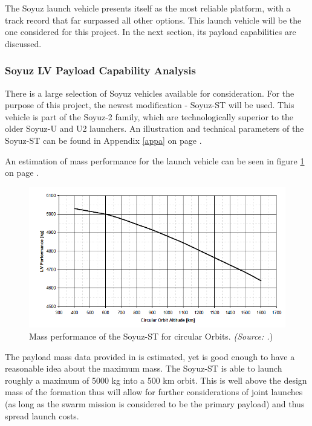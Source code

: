 The Soyuz launch vehicle presents itself as the most reliable platform, with a track record that far surpassed all other options. This launch vehicle will be the one considered for this project. In the next section, its payload capabilities are discussed.

\subsubsection{Soyuz LV Payload Capability Analysis}
\label{frLVPCA}

There is a large selection of Soyuz vehicles available for consideration. For the purpose of this project, the newest modification - Soyuz-ST will be used. This vehicle is part of the Soyuz-2 family, which are technologically superior to the older Soyuz-U and U2 launchers. An illustration and technical parameters of the Soyuz-ST can be found in Appendix \ref{appa} on page \pageref{appa} \cite{soyuzman}.

An estimation of mass performance for the launch vehicle can be seen in figure \ref{fig:massperformance} on page \pageref{fig:massperformance}.

\begin{figure}[ht]
\centering
\includegraphics[width=1.0\textwidth, angle=0]{chapters/img/lvmass.png}
\caption{Mass performance of the Soyuz-ST for circular Orbits. \emph{(Source: \cite{soyuzman}.})}
\label{fig:massperformance}
\end{figure}

The payload mass data provided in \cite{soyuzman} is estimated, yet is good enough to have a reasonable idea about the maximum mass. The Soyuz-ST is able to launch roughly a maximum of 5000 kg into a 500 km orbit. This is well above the design mass of the formation thus will allow for further considerations of joint launches (as long as the swarm mission is considered to be the primary payload) and thus spread launch costs. 

